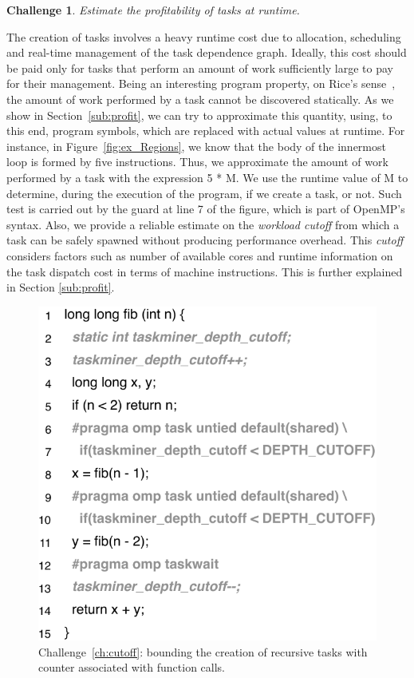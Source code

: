 \documentclass[sigplan,10pt,review,anonymous]{acmart}
\newtheorem{Challenge}{Challenge}[section]
\begin{document}
\begin{Challenge}
\label{ch:cost}
Estimate the profitability of tasks at runtime.
\end{Challenge}

The creation of tasks involves a heavy runtime cost due to allocation,
scheduling and real-time management of the task dependence graph.
Ideally, this cost should be paid only for tasks that perform an amount of work
sufficiently large to pay for their management.
Being an interesting program property, on Rice's sense~\cite{Rice53}, the amount
of work performed by a task cannot be discovered statically.
As we show in Section~\ref{sub:profit}, we can try to approximate this quantity, using,
to this end, program symbols, which are replaced with actual values at runtime.
For instance, in Figure~\ref{fig:ex_Regions}, we know that the body of the
innermost loop is formed by five instructions.
Thus, we approximate the amount of work performed by a task with the
expression \textsf{5 * M}.
We use the runtime value of \textsf{M} to determine, during the execution of the
program, if we create a task, or not.
Such test is carried out by the guard at line 7 of the figure, which is part of
OpenMP's syntax. Also, we provide a reliable estimate on the \emph{workload cutoff}
from which a task can be safely spawned without producing performance overhead.
This \emph{cutoff} considers factors such as number of available cores
and runtime information on the task dispatch cost in terms of machine
instructions. This is further explained in Section \ref{sub:profit}.

\begin{figure}[h!]
\begin{center}
\includegraphics[width=0.9\columnwidth]{images/ex_cutoff}
\caption{Challenge~\ref{ch:cutoff}: bounding the creation of recursive tasks with
counter associated with function calls.}
\label{fig:ex_cutoff}
\end{center}
\end{figure}
\end{document}
